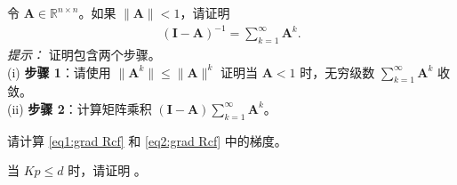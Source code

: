 \documentclass[../../book-main_zh.tex]{subfiles}
\begin{document}
\begin{exercise}[矩阵逆的诺伊曼级数]\label{ex:neumannn}
令 $\bm A \in \mathbb{R}^{n\times n}$。如果 $\|\bm A\| < 1$，请证明
\begin{align}\label{eq:neumann}
    \left( \bm I - \bm A\right)^{-1} = \sum_{k=1}^\infty \bm A^k.
\end{align}
{\em 提示：} 证明包含两个步骤。\\
(i) {\bf 步骤 1}：请使用 $\|\bm A^k\| \le \|\bm A\|^k$ 证明当 $\bm A < 1$ 时，无穷级数 $\sum_{k=1}^\infty \bm A^k$ 收敛。\\
(ii) {\bf 步骤 2}：计算矩阵乘积 $(\bm I - \bm A) \sum_{k=1}^\infty \bm A^k$。
\end{exercise}


\begin{exercise}
    请计算 \eqref{eq1:grad Rcf} 和 \eqref{eq2:grad Rcf} 中的梯度。
\end{exercise}


\begin{exercise}
    当 $Kp \le d$ 时，请证明 。
\end{exercise}
\end{document}
